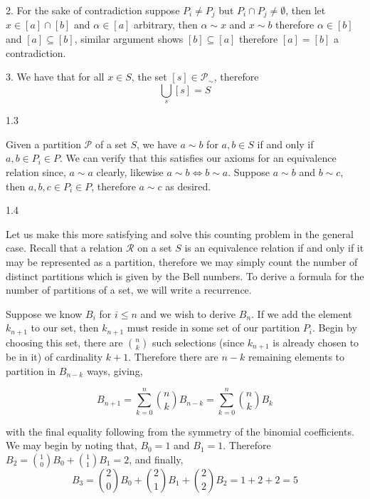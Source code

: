 \documentclass[letterpaper,12pt]{article}
\theoremstyle{definition}
\begin{document}
2. For the sake of contradiction suppose $P_i \neq P_j$ but $P_i \cap P_j \neq \emptyset$, then let $x \in [a] \cap [b]$ and $\alpha \in [a]$ arbitrary, then $\alpha \sim x$ and $x \sim b$ therefore $\alpha \in [b]$ and $[a] \subseteq [b]$, similar argument shows $[b] \subseteq [a]$ therefore $[a] = [b]$ a contradiction. 

3. We have that for all $x \in S$, the set $[s] \in \mathcal{P}_\sim$, therefore $$\bigcup_s [s] = S$$



\begin{flushleft}
	1.3
\end{flushleft}

Given a partition $\mathcal{P}$ of a set $S$, we have $a \sim b $ for $a, b \in S$ if and only if $a, b \in P_i \in P$. We can verify that this satisfies our axioms for an equivalence relation since, $a \sim a$ clearly, likewise $a \sim b \Leftrightarrow b \sim a$. Suppose $a \sim b$ and $b \sim c$, then $a, b, c \in P_i \in P$, therefore $a \sim c$ as desired.


\begin{flushleft}
	1.4
\end{flushleft}

Let us make this more satisfying and solve this counting problem in the general case. Recall that a relation $\mathcal{R}$ on a set $S$ is an equivalence relation if and only if it may be represented as a partition, therefore we may simply count the number of distinct partitions which is given by the Bell numbers. To derive a formula for the number of partitions of a set, we will write a recurrence. 

Suppose we know $B_i$ for $i \leq n$ and we wish to derive $B_n$. If we add the element $k_{n+1}$ to our set, then $k_{n+1}$ must reside in some set of our partition $P_i$. Begin by choosing this set, there are $\binom{n}{k}$ such selections (since $k_{n+1}$ is already chosen to be in it) of cardinality $k + 1$. Therefore there are $n - k$ remaining elements to partition in $B_{n-k}$ ways, giving,

$$B_{n+1} = \sum_{k=0}^n \binom{n}{k}B_{n-k} = \sum_{k=0}^n \binom{n}{k}B_{k}$$

with the final equality following from the symmetry of the binomial coefficients. We may begin by noting that, $B_0 = 1$ and $B_1 = 1$. Therefore $B_2 = \binom{1}{0}B_0 + \binom{1}{1}B_1 = 2$, and finally, $$B_3 = \binom{2}{0}B_0 + \binom{2}{1}B_1 + \binom{2}{2}B_2 = 1+ 2 + 2 = 5$$
\end{document}
